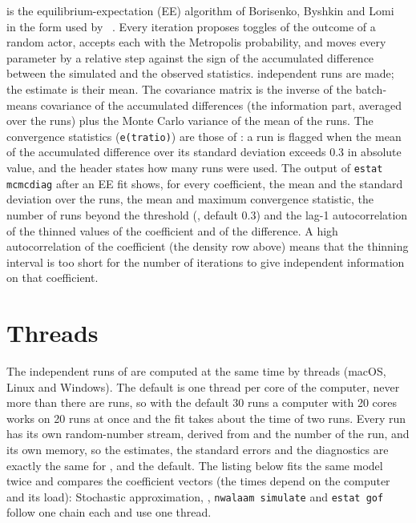  is the equilibrium-expectation (EE) algorithm of Borisenko, Byshkin and Lomi~\cite{borisenko2019} in the form used by \alaamee{}~\cite{stivala2024}. Every iteration proposes toggles of the outcome of a random actor, accepts each with the Metropolis probability, and moves every parameter by a relative step  against the sign of the accumulated difference between the simulated and the observed statistics.  independent runs are made; the estimate is their mean. The covariance matrix is the inverse of the batch-means covariance of the accumulated differences (the information part, averaged over the runs) plus the Monte Carlo variance of the mean of the runs. The convergence statistics (\texttt{e(tratio)}) are those of \alaamee{}: a run is flagged when the mean of the accumulated difference over its standard deviation exceeds $0.3$ in absolute value, and the header states how many runs were used.
The output of \texttt{estat mcmcdiag} after an EE fit shows, for every coefficient, the mean and the standard deviation over the runs, the mean and maximum convergence statistic, the number of runs beyond the threshold (, default $0.3$) and the lag-1 autocorrelation of the thinned values of the coefficient and of the difference. A high autocorrelation of the coefficient (the density row above) means that the thinning interval is too short for the number of iterations to give independent information on that coefficient.

\section{Threads}\label{sec:threads}

The independent runs of  are computed at the same time by  threads (macOS, Linux and Windows). The default is one thread per core of the computer, never more than there are runs, so with the default 30 runs a computer with 20 cores works on 20 runs at once and the fit takes about the time of two runs. Every run has its own random-number stream, derived from  and the number of the run, and its own memory, so the estimates, the standard errors and the diagnostics are exactly the same for ,  and the default. The listing below fits the same model twice and compares the coefficient vectors (the times depend on the computer and its load):
Stochastic approximation, , \texttt{nwalaam simulate} and \texttt{estat gof} follow one chain each and use one thread.

